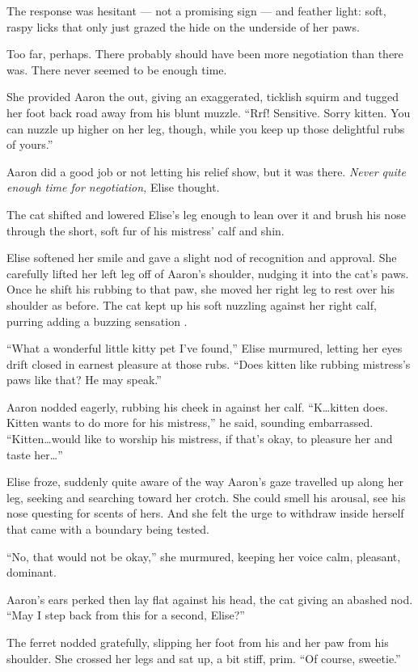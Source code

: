 The response was hesitant --- not a promising sign --- and feather light: soft, raspy licks that only just grazed the hide on the underside of her paws.

Too far, perhaps. There probably should have been more negotiation than there was. There never seemed to be enough time.

She provided Aaron the out, giving an exaggerated, ticklish squirm and tugged her foot back road away from his blunt muzzle. ``Rrf! Sensitive. Sorry kitten. You can nuzzle up higher on her leg, though, while you keep up those delightful rubs of yours.''

Aaron did a good job or not letting his relief show, but it was there. \emph{Never quite enough time for negotiation,} Elise thought.

The cat shifted and lowered Elise's leg enough to lean over it and brush his nose through the short, soft fur of his mistress' calf and shin.

Elise softened her smile and gave a slight nod of recognition and approval. She carefully lifted her left leg off of Aaron's shoulder, nudging it into the cat's paws. Once he shift his rubbing to that paw, she moved her right leg to rest over his shoulder as before. The cat kept up his soft nuzzling against her right calf, purring adding a buzzing sensation .

``What a wonderful little kitty pet I've found,'' Elise murmured, letting her eyes drift closed in earnest pleasure at those rubs. ``Does kitten like rubbing mistress's paws like that? He may speak.''

Aaron nodded eagerly, rubbing his cheek in against her calf. ``K\ldots{}kitten does. Kitten wants to do more for his mistress,'' he said, sounding embarrassed. ``Kitten\ldots{}would like to worship his mistress, if that's okay, to pleasure her and taste her\ldots{}''

Elise froze, suddenly quite aware of the way Aaron's gaze travelled up along her leg, seeking and searching toward her crotch. She could smell his arousal, see his nose questing for scents of hers. And she felt the urge to withdraw inside herself that came with a boundary being tested.

``No, that would not be okay,'' she murmured, keeping her voice calm, pleasant, dominant.

Aaron's ears perked then lay flat against his head, the cat giving an abashed nod. ``May I step back from this for a second, Elise?''

The ferret nodded gratefully, slipping her foot from his and her paw from his shoulder. She crossed her legs and sat up, a bit stiff, prim. ``Of course, sweetie.''

